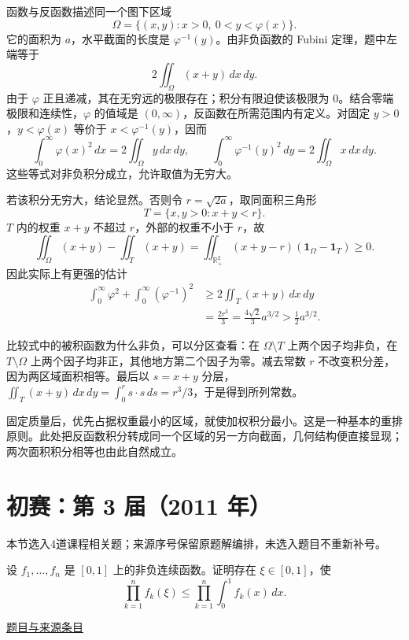 \documentclass[UTF8,12pt,a4paper,fontset=fandol]{ctexart}
\begin{document}
\begin{solve}\label{ans:pre02-math:8}

函数与反函数描述同一个图下区域
\[
\Omega=\{(x,y):x>0,\ 0<y<\varphi(x)\}.
\]
它的面积为 $a$，水平截面的长度是 $\varphi^{-1}(y)$。由非负函数的 Fubini 定理，题中左端等于
\[
2\iint_\Omega(x+y)\,dx\,dy.
\]
由于 $\varphi$ 正且递减，其在无穷远的极限存在；积分有限迫使该极限为 $0$。结合零端极限和连续性，$\varphi$ 的值域是 $(0,\infty)$，反函数在所需范围内有定义。对固定 $y>0$，$y<\varphi(x)$ 等价于 $x<\varphi^{-1}(y)$，因而
\[
\int_0^\infty\varphi(x)^2\,dx=2\iint_\Omega y\,dx\,dy,
\qquad
\int_0^\infty\varphi^{-1}(y)^2\,dy=2\iint_\Omega x\,dx\,dy.
\]
这些等式对非负积分成立，允许取值为无穷大。

若该积分无穷大，结论显然。否则令 $r=\sqrt{2a}$，取同面积三角形
\[
T=\{x,y>0:x+y<r\}.
\]
$T$ 内的权重 $x+y$ 不超过 $r$，外部的权重不小于 $r$，故
\[
\iint_\Omega(x+y)-\iint_T(x+y)
=\iint_{\mathbb R_+^2}(x+y-r)(\mathbf1_\Omega-\mathbf1_T)\ge0.
\]
因此实际上有更强的估计
\[
\begin{aligned}
\int_0^\infty\varphi^2+\int_0^\infty(\varphi^{-1})^2
&\ge2\iint_T(x+y)\,dx\,dy\\
&=\frac{2r^3}{3}
=\frac{4\sqrt2}{3}a^{3/2}
>\frac12a^{3/2}.
\end{aligned}
\]

比较式中的被积函数为什么非负，可以分区查看：在 $\Omega\setminus T$ 上两个因子均非负，在 $T\setminus\Omega$ 上两个因子均非正，其他地方第二个因子为零。减去常数 $r$ 不改变积分差，因为两区域面积相等。最后以 $s=x+y$ 分层，$\iint_T(x+y)\,dx\,dy=\int_0^r s\cdot s\,ds=r^3/3$，于是得到所列常数。

\end{solve}

\begin{remark}[方法与条件]固定质量后，优先占据权重最小的区域，就使加权积分最小。这是一种基本的重排原则。此处把反函数积分转成同一个区域的另一方向截面，几何结构便直接显现；两次面积积分相等也由此自然成立。\end{remark}

\section{初赛：第 3 届（2011 年）}

本节选入4道课程相关题；来源序号保留原题解编排，未选入题目不重新补号。

\begin{example}[来源序号2]\label{ex:pre03-math:2}\label{pr:pre03-math:2}

设 $f_1,\ldots,f_n$ 是 $[0,1]$ 上的非负连续函数。证明存在 $\xi\in[0,1]$，使
\[
\prod_{k=1}^nf_k(\xi)
\le\prod_{k=1}^n\int_0^1f_k(x)\,dx.
\]

\par\href{https://github.com/lzxcr/cmc-mathematics/blob/64916fa1fdbc3e444a652eca204d5669058ee321/src/problems/preliminary/03/02.md}{题目与来源条目}

\end{example}
\end{document}
